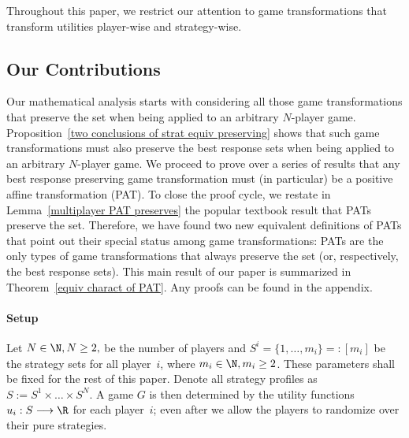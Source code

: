 Throughout this paper, we restrict our attention to game transformations that transform utilities player-wise and strategy-wise.

\subsection{Our Contributions}
Our mathematical analysis starts with considering all those game transformations that preserve the \NE{} set when being applied to an arbitrary $N$-player game. Proposition~\ref{two conclusions of strat equiv preserving} shows that such game transformations must also preserve the best response sets when being applied to an arbitrary $N$-player game. We proceed to prove over a series of results that any best response preserving game transformation must (in particular) be a positive affine transformation (PAT). To close the proof cycle, we restate  in Lemma~\ref{multiplayer PAT preserves} the popular textbook result that PATs preserve the \NE{} set. Therefore, we have found two new equivalent definitions of PATs that point out their special status among game transformations: PATs are the only types of game transformations that always preserve the \NE{} set (or, respectively, the best response sets). This main result of our paper is summarized in Theorem~\ref{equiv charact of PAT}. Any proofs can be found in the appendix.

\paragraph{Setup} 
Let $N \in \N, N \geq 2,$ be the number of players and $S^i = \{1, \ldots, m_i\} =: [m_i]$ be the strategy sets for all player~$i$, where $m_i \in \N, m_i \geq 2$. These parameters shall be fixed for the rest of this paper. Denote all strategy profiles as $S := S^1 \times \ldots \times S^N$. A game $G$ is then determined by the utility functions $u_i: S \longrightarrow \R$ for each player~$i$; even after we allow the players to randomize over their pure strategies.


